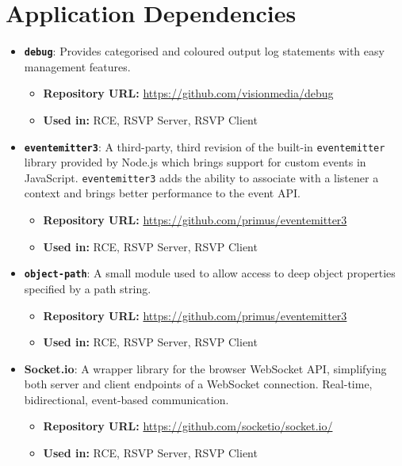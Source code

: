   \section{Application Dependencies}
    \begin{itemize}
      \item \textbf{\texttt{debug}}: Provides categorised and coloured output log statements with easy management features.
        \begin{itemize}
          \item \textbf{Repository URL:} \url{https://github.com/visionmedia/debug}
          \item \textbf{Used in:} RCE, RSVP Server, RSVP Client
        \end{itemize}
        
      \item \textbf{\texttt{eventemitter3}}: A third-party, third revision of the built-in \texttt{eventemitter} library provided by Node.js which brings support for custom events in JavaScript. \texttt{eventemitter3} adds the ability to associate with a listener a context and brings better performance to the event API.
        \begin{itemize}
          \item \textbf{Repository URL:} \url{https://github.com/primus/eventemitter3}
          \item \textbf{Used in:} RCE, RSVP Server, RSVP Client
        \end{itemize}
        
      \item \textbf{\texttt{object-path}}: A small module used to allow access to deep object properties specified by a path string.
        \begin{itemize}
          \item \textbf{Repository URL:} \url{https://github.com/primus/eventemitter3}
          \item \textbf{Used in:} RCE, RSVP Server, RSVP Client
        \end{itemize}
        
      \item \textbf{Socket.io}: A wrapper library for the browser WebSocket API, simplifying both server and client endpoints of a WebSocket connection. Real-time, bidirectional, event-based communication.
        \begin{itemize}
          \item \textbf{Repository URL:} \url{https://github.com/socketio/socket.io/}
          \item \textbf{Used in:} RCE, RSVP Server, RSVP Client
        \end{itemize}
        

\end{itemize}

